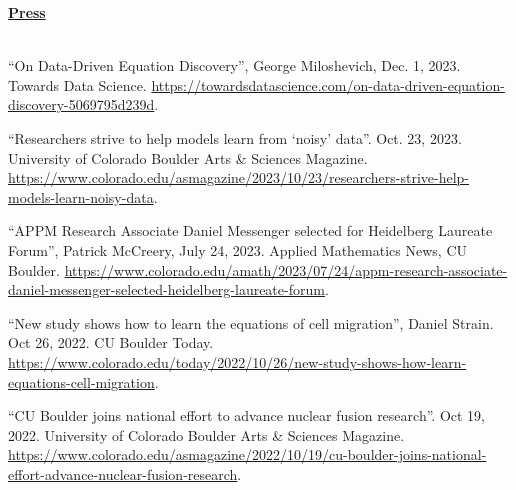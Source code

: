 \documentclass[letterpaper,11pt,oneside]{article}
\newcommand{\headr}[1]{\vspace{10pt}\uline{\Large{\textbf{#1}} \hfill } \\ \vspace{-10pt}\\}
\begin{document}
\headr{Press}
\vspace{-0.5cm}
\begin{sloppypar}
\begin{enumerate}[label={[\arabic*]}]
\item 
\raggedright``On Data-Driven Equation Discovery'', George Miloshevich, Dec. 1, 2023. Towards Data Science. {\footnotesize\url{https://towardsdatascience.com/on-data-driven-equation-discovery-5069795d239d}}.
\item 
\raggedright``Researchers strive to help models learn from ‘noisy’ data''. Oct. 23, 2023. University of Colorado Boulder Arts \& Sciences Magazine. {\footnotesize\url{https://www.colorado.edu/asmagazine/2023/10/23/researchers-strive-help-models-learn-noisy-data}}.
\item 
\raggedright``APPM Research Associate Daniel Messenger selected for Heidelberg Laureate Forum'', Patrick McCreery, July 24, 2023. Applied Mathematics News, CU Boulder. {\footnotesize\url{https://www.colorado.edu/amath/2023/07/24/appm-research-associate-daniel-messenger-selected-heidelberg-laureate-forum}}.
\item \raggedright``New study shows how to learn the equations of cell migration'', Daniel Strain. Oct 26, 2022. CU Boulder Today. {\footnotesize\url{https://www.colorado.edu/today/2022/10/26/new-study-shows-how-learn-equations-cell-migration}}.
\item 
\raggedright``CU Boulder joins national effort to advance nuclear fusion research''. Oct 19, 2022. University of Colorado Boulder Arts \& Sciences Magazine. {\footnotesize\url{https://www.colorado.edu/asmagazine/2022/10/19/cu-boulder-joins-national-effort-advance-nuclear-fusion-research}}.
\end{enumerate}
\end{sloppypar}
\end{document}

